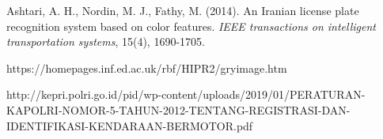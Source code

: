 \begin{thebibliography}{7}
{Ashtari, A. H., Nordin, M. J., Fathy, M. (2014). An Iranian license plate recognition system based on color features. \emph{IEEE transactions on intelligent transportation systems}, 15(4), 1690-1705.}

{https://homepages.inf.ed.ac.uk/rbf/HIPR2/gryimage.htm}

{http://kepri.polri.go.id/pid/wp-content/uploads/2019/01/PERATURAN-KAPOLRI-NOMOR-5-TAHUN-2012-TENTANG-REGISTRASI-DAN-IDENTIFIKASI-KENDARAAN-BERMOTOR.pdf}


\end{thebibliography}